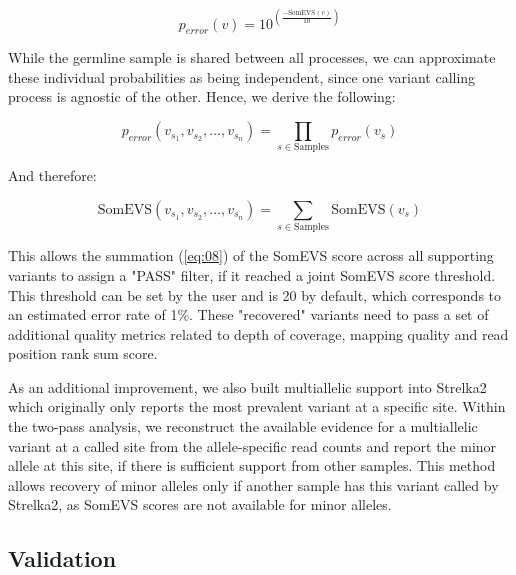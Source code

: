\begin{equation}
p_{error}(v) = 10^{\left( \frac{-\text{SomEVS}(v)}{10} \right)} \label{eq:06}
\end{equation}

While the germline sample is shared between all processes, we can approximate these individual probabilities as being independent, since one variant calling process is agnostic of the other. Hence, we derive the following:

\begin{equation}
p_{error}(v_{s_1},v_{s_2},\ldots,v_{s_n}) = \prod_{s \in \text{Samples}} p_{error}(v_{s}) \label{eq:07}
\end{equation}

And therefore:

\begin{equation}
\text{SomEVS}(v_{s_1},v_{s_2},\ldots,v_{s_n}) = \sum_{s \in \text{Samples}} \text{SomEVS}(v_{s}) \label{eq:08}
\end{equation}

This allows the summation (\autoref{eq:08}) of the SomEVS score across all supporting variants to assign a "PASS" filter, if it reached a joint SomEVS score threshold. This threshold can be set by the user and is 20 by default, which corresponds to an estimated error rate of 1\%. These "recovered" variants need to pass a set of additional quality metrics related to depth of coverage, mapping quality and read position rank sum score.

As an additional improvement, we also built multiallelic support into Strelka2 which originally only reports the most prevalent variant at a specific site. Within the two-pass analysis, we reconstruct the available evidence for a multiallelic variant at a called site from the allele-specific read counts and report the minor allele at this site, if there is sufficient support from other samples. This method allows recovery of minor alleles only if another sample has this variant called by Strelka2, as SomEVS scores are not available for minor alleles.


\subsection{Validation}

